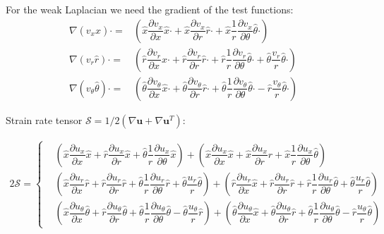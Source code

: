 \documentclass{kthreport}
\newcommand{\bigcdot}{\bm{\cdot}}
\begin{document}
For the weak Laplacian we need the gradient of the test functions:
\begin{subequations}
\begin{eqnarray}
	\nabla(v_{x}\hat{x})\bigcdot =& \left(\hat{x}\dfrac{\partial v_{x}}{\partial x} \hat{x}\bigcdot + \hat{x}\dfrac{\partial v_{x}}{\partial r}\hat{r}\bigcdot + \hat{x}\dfrac{1}{r}\dfrac{\partial v_{x}}{\partial \theta}\hat{\theta}\bigcdot \right)  \\
	\nabla(v_{r}\hat{r})\bigcdot = &\left(\hat{r}\dfrac{\partial v_{r}}{\partial x} \hat{x}\bigcdot + \hat{r}\dfrac{\partial v_{r}}{\partial r}\hat{r}\bigcdot + \hat{r}\dfrac{1}{r}\dfrac{\partial v_{r}}{\partial \theta}\hat{\theta}\bigcdot  + \hat{\theta}\dfrac{v_{r}}{r}\hat{\theta}\bigcdot \right) \\
	\nabla(v_{\theta}\hat{\theta})\bigcdot =&
	 \left(\hat{\theta}\dfrac{\partial v_{\theta}}{\partial x} \hat{x}\bigcdot + \hat{\theta}\dfrac{\partial v_{\theta}}{\partial r}\hat{r}\bigcdot + \hat{\theta}\dfrac{1}{r}\dfrac{\partial v_{\theta}}{\partial \theta}\hat{\theta}\bigcdot  - \hat{r}\dfrac{v_{\theta}}{r}\hat{\theta}\bigcdot  \right)
	\end{eqnarray}
\end{subequations}

Strain rate tensor $\mathcal{S} = 1/2(\nabla \bm{u} + \nabla \bm{u}^{T})$:

\begin{eqnarray}
	2\mathcal{S} = \left\{
	\begin{split}
		& \left(\hat{x}\dfrac{\partial u_{x}}{\partial x}\hat{x} + \hat{r}\dfrac{\partial u_{x}}{\partial r}\hat{x} + \hat{\theta}\dfrac{1}{r}\dfrac{\partial u_{x}}{\partial \theta}\hat{x}	\right) 
		+ \left(\hat{x}\dfrac{\partial u_{x}}{\partial x}\hat{x} + \hat{x}\dfrac{\partial u_{x}}{\partial r}\hat{r} + \hat{x}\dfrac{1}{r}\dfrac{\partial u_{x}}{\partial \theta}\hat{\theta}	\right) \\
		& \left(\hat{x}\dfrac{\partial u_{r}}{\partial x}\hat{r} + \hat{r}\dfrac{\partial u_{r}}{\partial r}\hat{r} + \hat{\theta}\dfrac{1}{r}\dfrac{\partial u_{r}}{\partial \theta} \hat{r}	 + \hat{\theta}\dfrac{u_{r}}{r}\hat{\theta}	\right) 
		+ \left(\hat{r}\dfrac{\partial u_{r}}{\partial x}\hat{x} + \hat{r}\dfrac{\partial u_{r}}{\partial r}\hat{r} + \hat{r}\dfrac{1}{r}\dfrac{\partial u_{r}}{\partial \theta} \hat{\theta} + \hat{\theta}\dfrac{u_{r}}{r}\hat{\theta}	\right) \\
		& \left(\hat{x}\dfrac{\partial u_{\theta}}{\partial x}\hat{\theta} + \hat{r}\dfrac{\partial u_{\theta}}{\partial r}\hat{\theta} + \hat{\theta}\dfrac{1}{r}\dfrac{\partial u_{\theta}}{\partial \theta}\hat{\theta} - \hat{\theta}\dfrac{u_{\theta}}{r}\hat{r}	\right)
		+ \left(\hat{\theta}\dfrac{\partial u_{\theta}}{\partial x}\hat{x} + \hat{\theta}\dfrac{\partial u_{\theta}}{\partial r}\hat{r} + \hat{\theta}\dfrac{1}{r}\dfrac{\partial u_{\theta}}{\partial \theta}\hat{\theta} - \hat{r}\dfrac{u_{\theta}}{r}\hat{\theta}	\right)
	\end{split}\right.
\end{eqnarray}
\end{document}
